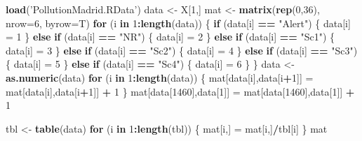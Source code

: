 \documentclass[]{article}
\newenvironment{Shaded}{\begin{snugshade}}{\end{snugshade}}
\newcommand{\ControlFlowTok}[1]{\textcolor[rgb]{0.13,0.29,0.53}{\textbf{#1}}}
\newcommand{\DataTypeTok}[1]{\textcolor[rgb]{0.13,0.29,0.53}{#1}}
\newcommand{\DecValTok}[1]{\textcolor[rgb]{0.00,0.00,0.81}{#1}}
\newcommand{\KeywordTok}[1]{\textcolor[rgb]{0.13,0.29,0.53}{\textbf{#1}}}
\newcommand{\NormalTok}[1]{#1}
\newcommand{\OperatorTok}[1]{\textcolor[rgb]{0.81,0.36,0.00}{\textbf{#1}}}
\newcommand{\StringTok}[1]{\textcolor[rgb]{0.31,0.60,0.02}{#1}}
\begin{document}
\begin{Shaded}
\begin{Highlighting}[]
\KeywordTok{load}\NormalTok{(}\StringTok{'PollutionMadrid.RData'}\NormalTok{)}
\NormalTok{data <-}\StringTok{  }\NormalTok{X[}\DecValTok{1}\NormalTok{,]}
\NormalTok{mat <-}\StringTok{ }\KeywordTok{matrix}\NormalTok{(}\KeywordTok{rep}\NormalTok{(}\DecValTok{0}\NormalTok{,}\DecValTok{36}\NormalTok{), }\DataTypeTok{nrow=}\DecValTok{6}\NormalTok{, }\DataTypeTok{byrow=}\NormalTok{T)}
\ControlFlowTok{for}\NormalTok{ (i }\ControlFlowTok{in} \DecValTok{1}\OperatorTok{:}\KeywordTok{length}\NormalTok{(data)) \{}
  \ControlFlowTok{if}\NormalTok{ (data[i] }\OperatorTok{==}\StringTok{ "Alert"}\NormalTok{) \{}
\NormalTok{    data[i] =}\StringTok{ }\DecValTok{1}
\NormalTok{  \} }\ControlFlowTok{else} \ControlFlowTok{if}\NormalTok{ (data[i] }\OperatorTok{==}\StringTok{ "NR"}\NormalTok{) \{}
\NormalTok{    data[i] =}\StringTok{ }\DecValTok{2}
\NormalTok{  \} }\ControlFlowTok{else} \ControlFlowTok{if}\NormalTok{ (data[i] }\OperatorTok{==}\StringTok{ "Sc1"}\NormalTok{) \{}
\NormalTok{    data[i] =}\StringTok{ }\DecValTok{3}
\NormalTok{  \} }\ControlFlowTok{else} \ControlFlowTok{if}\NormalTok{ (data[i] }\OperatorTok{==}\StringTok{ "Sc2"}\NormalTok{) \{}
\NormalTok{    data[i] =}\StringTok{ }\DecValTok{4} 
\NormalTok{  \} }\ControlFlowTok{else} \ControlFlowTok{if}\NormalTok{ (data[i] }\OperatorTok{==}\StringTok{ "Sc3"}\NormalTok{) \{}
\NormalTok{    data[i] =}\StringTok{ }\DecValTok{5}
\NormalTok{  \} }\ControlFlowTok{else} \ControlFlowTok{if}\NormalTok{ (data[i] }\OperatorTok{==}\StringTok{ "Sc4"}\NormalTok{) \{}
\NormalTok{    data[i] =}\StringTok{ }\DecValTok{6}
\NormalTok{  \}}
\NormalTok{\}}
\NormalTok{data <-}\StringTok{ }\KeywordTok{as.numeric}\NormalTok{(data)}
\ControlFlowTok{for}\NormalTok{ (i }\ControlFlowTok{in} \DecValTok{1}\OperatorTok{:}\KeywordTok{length}\NormalTok{(data)) \{}
\NormalTok{  mat[data[i],data[i}\OperatorTok{+}\DecValTok{1}\NormalTok{]] =}\StringTok{ }\NormalTok{mat[data[i],data[i}\OperatorTok{+}\DecValTok{1}\NormalTok{]] }\OperatorTok{+}\StringTok{ }\DecValTok{1}
\NormalTok{\}}
\NormalTok{mat[data[}\DecValTok{1460}\NormalTok{],data[}\DecValTok{1}\NormalTok{]] =}\StringTok{ }\NormalTok{mat[data[}\DecValTok{1460}\NormalTok{],data[}\DecValTok{1}\NormalTok{]] }\OperatorTok{+}\StringTok{ }\DecValTok{1}

\NormalTok{tbl <-}\StringTok{ }\KeywordTok{table}\NormalTok{(data)}
\ControlFlowTok{for}\NormalTok{ (i }\ControlFlowTok{in} \DecValTok{1}\OperatorTok{:}\KeywordTok{length}\NormalTok{(tbl)) \{}
\NormalTok{  mat[i,] =}\StringTok{ }\NormalTok{mat[i,]}\OperatorTok{/}\NormalTok{tbl[i]}
\NormalTok{\}}
\NormalTok{mat}
\end{Highlighting}
\end{Shaded}
\end{document}
